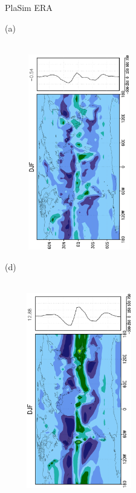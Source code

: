 \documentclass[12pt,a4paper,twoside,openright,headinclude,liststotoc,bibtotoc]{scrreprt}
\begin{document}
\begin{figure}[H]
\hspace{2.9cm}PlaSim \vspace{0.2cm}\hspace{7.2cm} ERA \\
\parbox{8.5cm}{\hspace{0.50cm}\begin{scriptsize}(a)\end{scriptsize} \vspace{-0.7cm} \\
\includegraphics[height=8.5cm,width=6.5cm,angle=-90]
{eps/zonalfinalpluspeDJF.eps}
}
\parbox{8.5cm}{\hspace{0.35cm}\begin{scriptsize}(d)\end{scriptsize} \vspace{-0.7cm} \\
\includegraphics[height=8.5cm,width=6.5cm,angle=-90]
{eps/zonalt21finalpluspeDJF.eps}
}
\end{figure}
\end{document}
